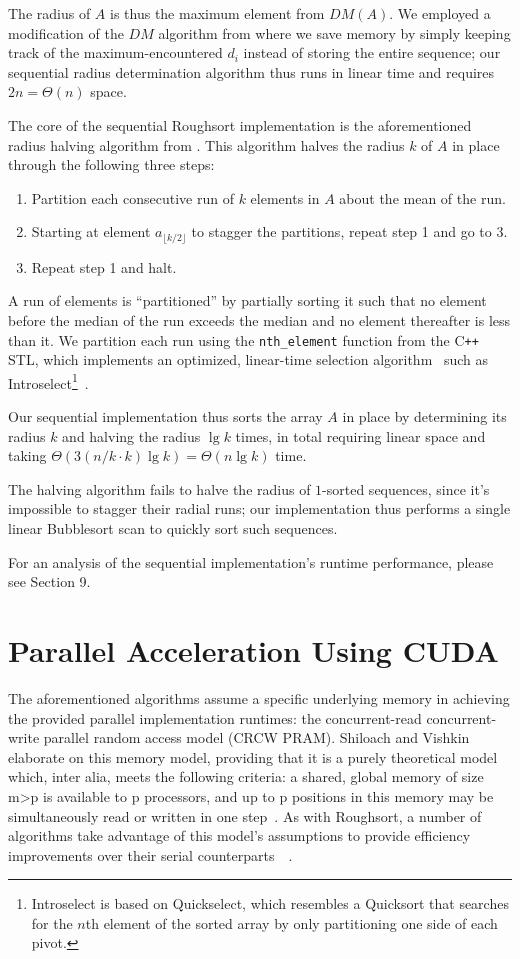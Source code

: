 \documentclass[letterpaper, 12pt]{article}
\let\supercite\cite
\renewcommand{\cite}[1]{\textnormal{~\supercite{#1}}}
\begin{document}
The radius of $A$ is thus the maximum element from $DM(A)$. We employed a modification of the $DM$ algorithm from
  \supercite{altman89} where we save memory by simply keeping track of the maximum-encountered $d_i$ instead of storing the
  entire sequence; our sequential radius determination algorithm thus runs in linear time and requires $2n = \Theta(n)$ space.

The core of the sequential Roughsort implementation is the aforementioned radius halving algorithm from \supercite{altman89}.
This algorithm halves the radius $k$ of $A$ in place through the following three steps:
\begin{enumerate}\setlength{\itemsep}{0pt}\setlength{\parskip}{0pt}
\item Partition each consecutive run of $k$ elements in $A$ about the mean of the run.
\item Starting at element $a_{\lfloor k/2 \rfloor}$ to stagger the partitions, repeat step 1 and go to 3.
\item Repeat step 1 and halt.
\end{enumerate}
A run of elements is ``partitioned'' by partially sorting it such that no element before the median of the run exceeds
  the median and no element thereafter is less than it.
We partition each run using the \texttt{nth_element} function from the  C\texttt{++} STL, which implements an optimized,
  linear-time selection algorithm\cite{clrs} such as
  Introselect\footnote{Introselect is based on Quickselect, which resembles a Quicksort
  that searches for the $n$th element of the sorted array by only partitioning one side of each pivot.}\cite{selectalg}.

Our sequential implementation thus sorts the array $A$ in place by determining its radius $k$ and halving the radius
  $\lg k$ times, in total requiring linear space and taking $\Theta(3(n/k \cdot k) \lg k) = \Theta(n \lg k)$ time.

The halving algorithm fails to halve the radius of $1$-sorted sequences, since it's impossible to stagger their radial runs;
  our implementation thus performs a single linear Bubblesort scan to quickly sort such sequences.

For an analysis of the sequential implementation's runtime performance, please see Section 9.

\section{Parallel Acceleration Using CUDA}
  The aforementioned algorithms assume a specific underlying memory in achieving the provided parallel implementation runtimes: the concurrent-read concurrent-write parallel random access model (CRCW PRAM).  Shiloach and Vishkin elaborate on this memory model, providing that it is a purely theoretical model which, inter alia, meets the following criteria: a shared, global memory of size m\textgreater p is available to p processors, and up to p positions in this memory may be simultaneously read or written in one step\cite{Shiloach1981}.  As with Roughsort, a number of algorithms take advantage of this model\textquoteright s assumptions to provide efficiency improvements over their serial counterparts\cite{Shiloach1982}\cite{raj1989}.
\end{document}
